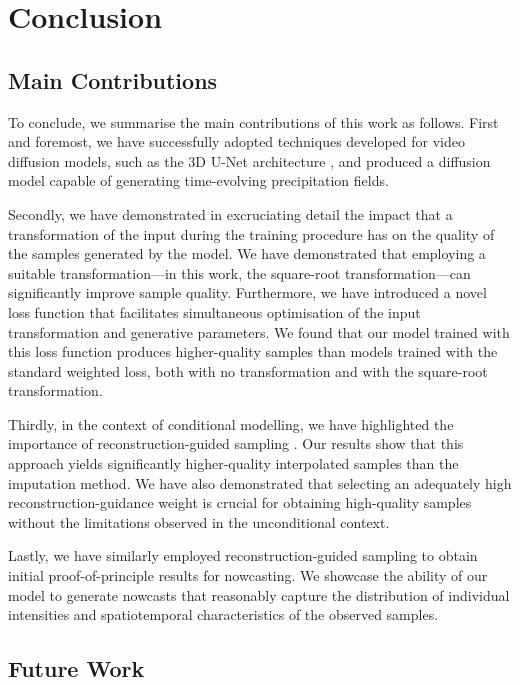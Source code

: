 \documentclass[ oneside,%
                    author={George Herbert},
                    degree={MSci},
                     title={Diffusion Models for Time-Evolving Precipitation Fields},
                  subtitle={}]{dissertation}
\begin{document}

\chapter{Conclusion}
\label{chap:conclusion}

\section{Main Contributions}

To conclude, we summarise the main contributions of this work as follows. First and foremost, we have successfully adopted techniques developed for video diffusion models, such as the 3D U-Net architecture \cite{VDM_Ho}, and produced a diffusion model capable of generating time-evolving precipitation fields.

Secondly, we have demonstrated in excruciating detail the impact that a transformation of the input during the training procedure has on the quality of the samples generated by the model. We have demonstrated that employing a suitable transformation---in this work, the square-root transformation---can significantly improve sample quality. Furthermore, we have introduced a novel loss function that facilitates simultaneous optimisation of the input transformation and generative parameters. We found that our model trained with this loss function produces higher-quality samples than models trained with the standard weighted loss, both with no transformation and with the square-root transformation.

Thirdly, in the context of conditional modelling, we have highlighted the importance of reconstruction-guided sampling \cite{VDM_Ho}. Our results show that this approach yields significantly higher-quality interpolated samples than the imputation method. We have also demonstrated that selecting an adequately high reconstruction-guidance weight is crucial for obtaining high-quality samples without the limitations observed in the unconditional context.

Lastly, we have similarly employed reconstruction-guided sampling to obtain initial proof-of-principle results for nowcasting. We showcase the ability of our model to generate nowcasts that reasonably capture the distribution of individual intensities and spatiotemporal characteristics of the observed samples.

\section{Future Work}
\end{document}
